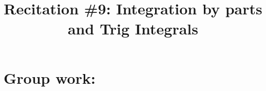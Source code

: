 \documentclass[handout]{ximera}
\title{Recitation \#9: Integration by parts and Trig Integrals}
\begin{document}
\begin{abstract}		\end{abstract}
\maketitle



\begin{comment}
\section{Warm up:}

	\begin{freeResponse}
	
	\end{freeResponse}
	
\begin{instructorNotes}

\end{instructorNotes}
\end{comment}







\section{Group work:}
\end{document}
